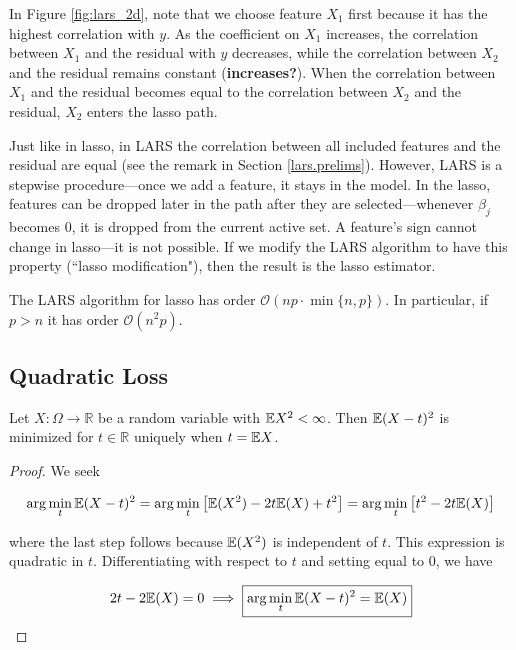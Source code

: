 In Figure \ref{fig:lars_2d}, note that we choose feature \(X_1\) first because it has the highest correlation with \(y\). As the coefficient on \(X_1\) increases, the correlation between \(X_1\) and the residual with \(y\) decreases, while the correlation between \(X_2\) and the residual remains constant (\textbf{increases?}). When the correlation between \(X_1\) and the residual becomes equal to the correlation between \(X_2\) and the residual, \(X_2\) enters the lasso path.

\begin{remark} Just like in lasso, in LARS the correlation between all included features and the residual are equal (see the remark in Section \ref{lars.prelims}). However, LARS is a stepwise procedure---once we add a feature, it stays in the model. In the lasso, features can be dropped later in the path after they are selected---whenever \(\beta_j\) becomes 0, it is dropped from the current active set. A feature's sign cannot change in lasso---it is not possible. If we modify the LARS algorithm to have this property (``lasso modification"), then the result is the lasso estimator.

\end{remark}

The LARS algorithm for lasso has order \(\mathcal{O}(np \cdot \min \{n, p\})\). In particular, if \(p > n\) it has order \(\mathcal{O}(n^2p)\).


\subsection{Quadratic Loss}

\begin{theorem}\label{exercise6.5}
Let $X:\Omega\to\mathbb{R}$ be a random variable with $\E X^{2}<\infty$. Then $\E(X-t)^{2}$ is minimized for $t\in\mathbb{R}$ uniquely when $t=\E X$.
\end{theorem}

\begin{proof}


We seek

\[
 \arg \min_t \E(X - t)^2 = \arg \min_t \big[ \E(X^2) - 2t\E(X) + t^2 \big] = \arg \min_t \big[  t^2 - 2t\E(X)\big] 
\]

where the last step follows because \(\E(X^2)\) is independent of \(t\). This expression is quadratic in \(t\). Differentiating with respect to \(t\) and setting equal to 0, we have

\[
2t - 2 \E(X) = 0 \implies \boxed{\arg \min_t \E(X - t)^2 = \E(X)}
\]

\end{proof}

